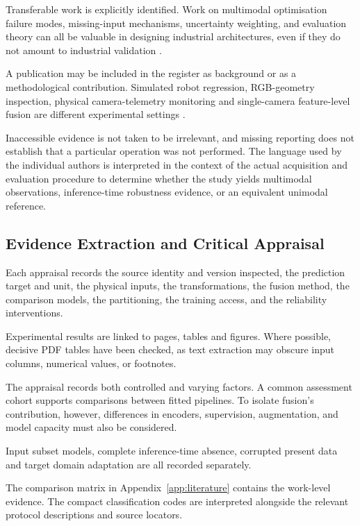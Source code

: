 Transferable work is explicitly identified. Work on multimodal optimisation failure modes,
missing-input mechanisms, uncertainty weighting, and evaluation theory can all be valuable in
designing industrial architectures, even if they do not amount to industrial validation
\parencite{wang_what_2020,ma_are_2022,lee_rethinking_2026,bengio_no_2004}.

A publication may be included in the register as background or as a methodological contribution.
Simulated robot regression, RGB-geometry inspection, physical camera-telemetry monitoring and
single-camera feature-level fusion are different experimental settings
\parencite{altinses_deep_2023,deng_tc-maf_2026,thoduka_multimodal_2024,zhang_combined_2024}.

Inaccessible evidence is not taken to be irrelevant, and missing reporting does not establish that a
particular operation was not performed. The language used by the individual authors is interpreted
in the context of the actual acquisition and evaluation procedure to determine whether the study
yields multimodal observations, inference-time robustness evidence, or an equivalent unimodal
reference.

\subsection{Evidence Extraction and Critical Appraisal}

Each appraisal records the source identity and version inspected, the prediction target and unit,
the physical inputs, the transformations, the fusion method, the comparison models, the
partitioning, the training access, and the reliability interventions.

Experimental results are linked to pages, tables and figures. Where possible, decisive PDF tables
have been checked, as text extraction may obscure input columns, numerical values, or footnotes.

The appraisal records both controlled and varying factors. A common assessment cohort supports
comparisons between fitted pipelines. To isolate fusion's contribution, however, differences in
encoders, supervision, augmentation, and model capacity must also be considered.

Input subset models, complete inference-time absence, corrupted present data and target domain
adaptation are all recorded separately.

The comparison matrix in Appendix~\ref{app:literature} contains the work-level evidence. The compact
classification codes are interpreted alongside the relevant protocol descriptions and source
locators.


